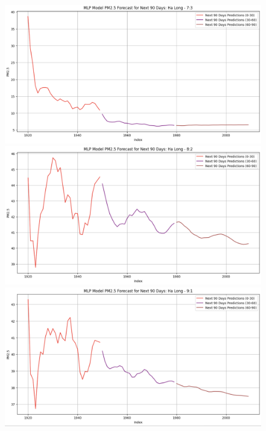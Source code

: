 
\begin{figure}[H]

    \begin{minipage}{0.15\textwidth}
        \centering
        \includegraphics[width=1\textwidth]{img/final/MLP/90D/MLP_7_3_HL_90D.png}
        \end{minipage}
        \hfill
        \begin{minipage}{0.15\textwidth}
        \centering
        \includegraphics[width=1\textwidth]{img/final/MLP/90D/MLP_8_2_HL_90D.png}
        \end{minipage}
        \hfill
        \begin{minipage}{0.15\textwidth}
        \centering
        \includegraphics[width=1\textwidth]{img/final/MLP/90D/MLP_9_1_HL_90D.png}
        \end{minipage}
        \hfill


\end{figure}
